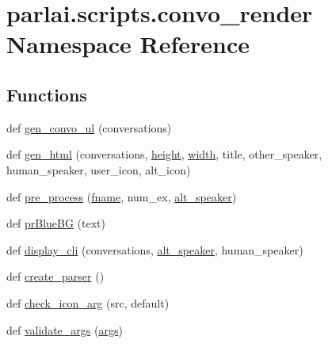 \hypertarget{namespaceparlai_1_1scripts_1_1convo__render}{}\section{parlai.\+scripts.\+convo\+\_\+render Namespace Reference}
\label{namespaceparlai_1_1scripts_1_1convo__render}
\subsection*{Functions}
\begin{DoxyCompactItemize}
\item 
def \hyperlink{namespaceparlai_1_1scripts_1_1convo__render_a8c393321c36d1cafceb86aa3f7431c4c}{gen\+\_\+convo\+\_\+ul} (conversations)
\item 
def \hyperlink{namespaceparlai_1_1scripts_1_1convo__render_ad23695f4d64e7dbd1fee801098d570b2}{gen\+\_\+html} (conversations, \hyperlink{namespaceparlai_1_1scripts_1_1convo__render_a3ea95c859b230a646a5c6fe5b4586b67}{height}, \hyperlink{namespaceparlai_1_1scripts_1_1convo__render_a9781c43527eb370030ea6f1cafca6a3a}{width}, title, other\+\_\+speaker, human\+\_\+speaker, user\+\_\+icon, alt\+\_\+icon)
\item 
def \hyperlink{namespaceparlai_1_1scripts_1_1convo__render_a0f0a031443ca797c936d2961a702a45e}{pre\+\_\+process} (\hyperlink{namespaceparlai_1_1scripts_1_1convo__render_afdeec635d90f882f6f9c117a9cf62010}{fname}, num\+\_\+ex, \hyperlink{namespaceparlai_1_1scripts_1_1convo__render_a516a38b04ed5b7cf0c03ed2ea0e99d46}{alt\+\_\+speaker})
\item 
def \hyperlink{namespaceparlai_1_1scripts_1_1convo__render_a21a7681b9803eb6994ac72c7d480cb94}{pr\+Blue\+BG} (text)
\item 
def \hyperlink{namespaceparlai_1_1scripts_1_1convo__render_a68e7e186a59ac2397560d0107f804ff3}{display\+\_\+cli} (conversations, \hyperlink{namespaceparlai_1_1scripts_1_1convo__render_a516a38b04ed5b7cf0c03ed2ea0e99d46}{alt\+\_\+speaker}, human\+\_\+speaker)
\item 
def \hyperlink{namespaceparlai_1_1scripts_1_1convo__render_a4220e40f3e0c5ac320177b6e0f3d8e83}{create\+\_\+parser} ()
\item 
def \hyperlink{namespaceparlai_1_1scripts_1_1convo__render_ac7e3c84a7f6e3b488360319b597eda18}{check\+\_\+icon\+\_\+arg} (src, default)
\item 
def \hyperlink{namespaceparlai_1_1scripts_1_1convo__render_a4078a037f4f5526297e7860fbed9cfb2}{validate\+\_\+args} (\hyperlink{namespaceparlai_1_1scripts_1_1convo__render_a9db4d889d4ee08e848b2c0526120483b}{args})
\end{DoxyCompactItemize}
